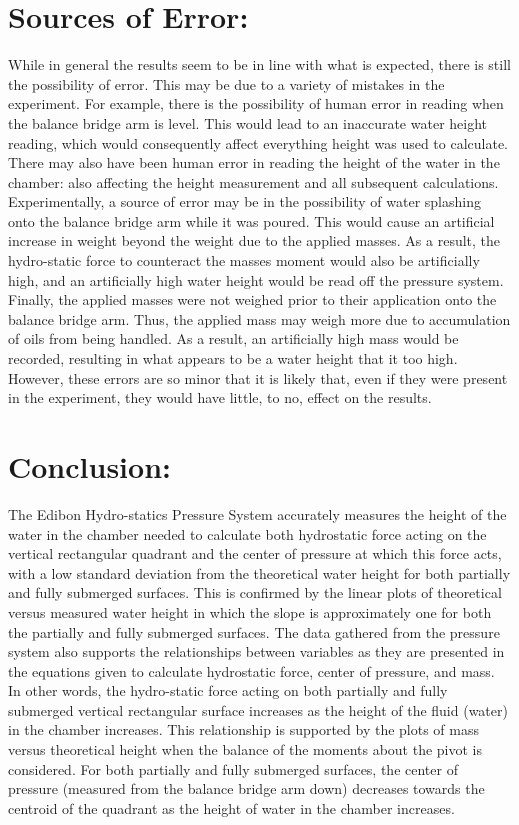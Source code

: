 \documentclass[12pt,a4paper]{article}
\begin{document}
\section{Sources of Error:}
While in general the results seem to be in line with what is expected, there is still the possibility
of error. This may be due to a variety of mistakes in the experiment. For example, there is the possibility of human error in reading when the balance bridge arm is level. This would lead to an inaccurate water height reading, which would consequently affect everything height was used to calculate. There may also have been human error in reading the height of the water in the chamber: also affecting the height measurement and all subsequent calculations.\\
Experimentally, a source of error may be in the possibility of water splashing onto the balance bridge arm while it was poured. This would cause an artificial increase in weight beyond the weight due to the applied masses. As a result, the hydro-static force to counteract the masses moment would also be artificially high, and an artificially high water height would be read off the pressure system. Finally, the applied masses were not weighed prior to their application onto the balance bridge arm. Thus, the applied mass may weigh more due to accumulation of oils from being handled. As a result, an artificially high mass would be recorded, resulting in what appears to be a water height that it too high. However, these errors are so minor that it
is likely that, even if they were present in the experiment, they would have little, to no, effect on the results.
\section{Conclusion:}
The Edibon Hydro-statics Pressure System accurately measures the height of the water in the chamber needed to calculate both hydrostatic force acting on the vertical rectangular quadrant and the center of pressure at which this force acts, with a low standard deviation from the theoretical water height for both partially and fully submerged surfaces. This is confirmed by the linear plots of theoretical versus measured water height in which the slope is approximately one for both the partially and fully submerged surfaces. The data gathered from the pressure system also supports the relationships between variables as they are presented in the equations given to calculate hydrostatic force, center of pressure, and mass. In other words, the hydro-static force acting on both partially and fully submerged vertical rectangular surface increases
as the height of the fluid (water) in the chamber increases. This relationship is supported by the plots of mass versus theoretical height when the balance of the moments about the pivot is considered. For both partially and fully submerged surfaces, the center of pressure (measured from the balance bridge arm down) decreases towards the centroid of the quadrant as the height of water in the chamber increases.
\end{document}
